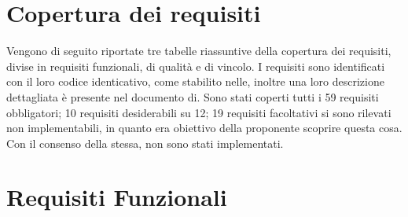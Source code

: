\section{Copertura dei requisiti}
Vengono di seguito riportate tre tabelle riassuntive della copertura dei requisiti, divise in requisiti funzionali, di qualità e di vincolo. I requisiti sono identificati con il loro codice identicativo, come stabilito nelle\normediprogetto, inoltre una loro descrizione dettagliata è presente nel documento di\analisideirequisiti. Sono stati coperti tutti i 59 requisiti obbligatori; 10 requisiti desiderabili su 12; 19 requisiti facoltativi si sono rilevati non implementabili, in quanto era obiettivo della proponente scoprire questa cosa. Con il consenso della stessa, non sono stati implementati.
\section{Requisiti Funzionali}
\normalsize
